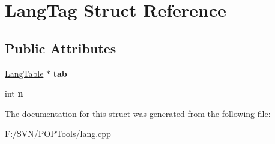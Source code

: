 \hypertarget{struct_lang_tag}{\section{Lang\-Tag Struct Reference}
\label{struct_lang_tag}
}
\subsection*{Public Attributes}
\begin{DoxyCompactItemize}
\item 
\hypertarget{struct_lang_tag_a7cf6777f4e36eb96cd2194134f0dee0d}{\hyperlink{struct_lang_table_tag}{Lang\-Table} $\ast$ {\bfseries tab}}\label{struct_lang_tag_a7cf6777f4e36eb96cd2194134f0dee0d}

\item 
\hypertarget{struct_lang_tag_a8998d4a26d252d0d2eed96596786eb22}{int {\bfseries n}}\label{struct_lang_tag_a8998d4a26d252d0d2eed96596786eb22}

\end{DoxyCompactItemize}


The documentation for this struct was generated from the following file\-:\begin{DoxyCompactItemize}
\item 
F\-:/\-S\-V\-N/\-P\-O\-P\-Tools/lang.\-cpp\end{DoxyCompactItemize}
